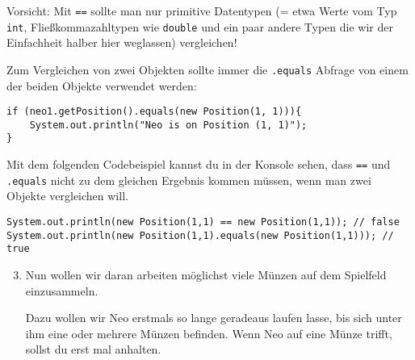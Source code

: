 \begin{Infobox}[\lstinline{==} und die \lstinline{equals()}-Methode]
	Vorsicht: Mit \lstinline{==} sollte man nur primitive Datentypen (= etwa Werte vom Typ \lstinline{int}, Fließkommazahltypen wie \lstinline{double} und ein paar andere Typen die wir der Einfachheit halber hier weglassen) vergleichen!

	Zum Vergleichen von zwei Objekten sollte immer die \lstinline{.equals} Abfrage von einem der beiden Objekte verwendet werden:

	\begin{lstlisting}[numbers=none]
if (neo1.getPosition().equals(new Position(1, 1))){
	System.out.println("Neo is on Position (1, 1)");
}
	\end{lstlisting}

	Mit dem folgenden Codebeispiel kannst du in der Konsole sehen, dass \lstinline{==} und \lstinline{.equals} nicht zu dem gleichen Ergebnis kommen müssen, wenn man zwei Objekte vergleichen will.

	\begin{lstlisting}[numbers=none]
System.out.println(new Position(1,1) == new Position(1,1)); // false
System.out.println(new Position(1,1).equals(new Position(1,1))); // true
	\end{lstlisting}

\end{Infobox}


\begin{enumerate}\setcounter{enumi}{2}
	\item
	 	Nun wollen wir daran arbeiten möglichst viele Münzen auf dem Spielfeld einzusammeln.

		Dazu wollen wir Neo erstmals so lange geradeaus laufen lasse, bis sich unter ihm eine oder mehrere Münzen befinden.
		Wenn Neo auf eine Münze trifft, sollst du erst mal anhalten.
\end{enumerate}


